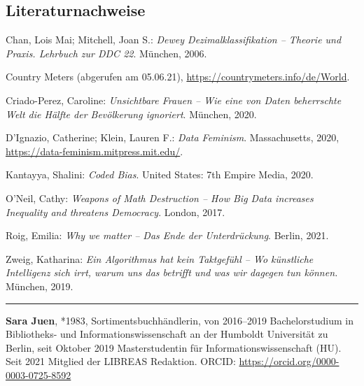 \documentclass[a4paper,
fontsize=11pt,
oneside,
numbers=noperiodatend,
parskip=half-,
bibliography=totoc,
final
]{scrartcl}
\begin{document}
\vspace{2em}

\subsection{Literaturnachweise}

Chan, Lois Mai; Mitchell, Joan S.: \emph{Dewey Dezimalklassifikation --
Theorie und Praxis. Lehrbuch zur DDC 22}. München, 2006.

Country Meters (abgerufen am 05.06.21),
\url{https://countrymeters.info/de/World}.

Criado-Perez, Caroline: \emph{Unsichtbare Frauen -- Wie eine von Daten
beherrschte Welt die Hälfte der Bevölkerung ignoriert}. München, 2020.

D'Ignazio, Catherine; Klein, Lauren F.: \emph{Data Feminism}.
Massachusetts, 2020, \linebreak \url{https://data-feminism.mitpress.mit.edu/}.

Kantayya, Shalini: \emph{Coded Bias}. United States: 7th Empire Media,
2020.

O'Neil, Cathy: \emph{Weapons of Math Destruction -- How Big Data
increases Inequality and threatens Democracy}. London, 2017.

Roig, Emilia: \emph{Why we matter -- Das Ende der Unterdrückung}.
Berlin, 2021.

Zweig, Katharina: \emph{Ein Algorithmus hat kein Taktgefühl -- Wo
künstliche Intelligenz sich irrt, warum uns das betrifft und was wir
dagegen tun können.} München, 2019.

\begin{center}\rule{0.5\linewidth}{0.5pt}\end{center}

\textbf{Sara Juen}, *1983, Sortimentsbuchhändlerin, von 2016--2019
Bachelorstudium in Bibliotheks- und Informationswissenschaft an der
Humboldt Universität zu Berlin, seit Oktober 2019 Masterstudentin für
Informationswissenschaft (HU). Seit 2021 Mitglied der LIBREAS Redaktion.
ORCID: \url{https://orcid.org/0000-0003-0725-8592}
\end{document}
